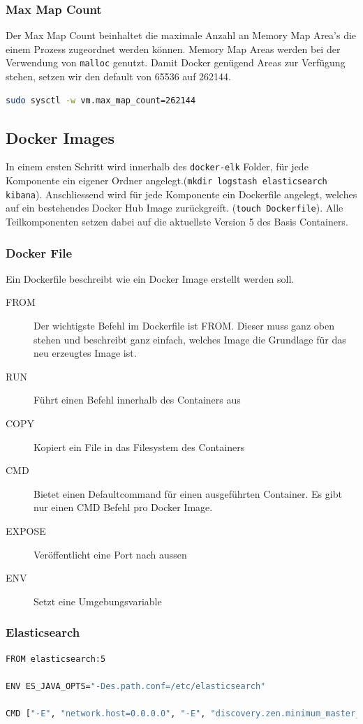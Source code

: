 \subsubsection{Max Map Count}
Der Max Map Count beinhaltet die maximale Anzahl an Memory Map Area's die einem Prozess zugeordnet werden können. Memory Map Areas werden bei der Verwendung von \lstinline[]|malloc| genutzt. Damit Docker genügend Areas zur Verfügung stehen, setzen wir den default von 65536 auf 262144.
\begin{lstlisting}[language=bash]
sudo sysctl -w vm.max_map_count=262144
\end{lstlisting}

\subsection{Docker Images}
In einem ersten Schritt wird innerhalb des \lstinline[]|docker-elk| Folder, für jede Komponente ein eigener Ordner angelegt.(\lstinline[]|mkdir logstash elasticsearch kibana|). Anschliessend wird für jede Komponente ein Dockerfile angelegt, welches auf ein bestehendes Docker Hub Image zurückgreift. (\lstinline[]|touch Dockerfile|). Alle Teilkomponenten setzen dabei auf die aktuellste Version 5 des Basis Containers.

\subsubsection{Docker File}
Ein Dockerfile beschreibt wie ein Docker Image erstellt werden soll. 
\begin{description}
	\item[FROM] Der wichtigste Befehl im Dockerfile ist FROM. Dieser muss ganz oben stehen und beschreibt ganz einfach, welches Image die Grundlage für das neu erzeugtes Image ist.	
	\item[RUN] Führt einen Befehl innerhalb des Containers aus
	\item[COPY] Kopiert ein File in das Filesystem des Containers
	\item[CMD] Bietet einen Defaultcommand für einen ausgeführten Container. Es gibt nur einen CMD Befehl pro Docker Image.
	\item[EXPOSE] Veröffentlicht eine Port nach aussen
	\item[ENV] Setzt eine Umgebungsvariable
\end{description}

\subsubsection{Elasticsearch}
\begin{lstlisting}[caption=Elasticsearch Dockerfile, language=bash]
FROM elasticsearch:5

ENV ES_JAVA_OPTS="-Des.path.conf=/etc/elasticsearch"

CMD ["-E", "network.host=0.0.0.0", "-E", "discovery.zen.minimum_master_nodes=1"]
\end{lstlisting}

